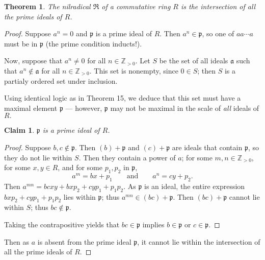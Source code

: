 \documentclass[11pt]{article}
\newtheorem{theorem}{Theorem}
\newtheorem{claim}{Claim}
\begin{document}
\begin{adjustwidth}{0.5cm}{}
	\begin{theorem}
		The nilradical $\mathfrak{R}$ of a commutative ring $R$ is the intersection of all the prime ideals of $R$.
	\end{theorem}
	\begin{proof}
		Suppose $a^{n} = 0$ and $\mathfrak{p}$ is a prime ideal of $R$. Then $a^{n} \in \mathfrak{p}$, so one of $aa \cdots a$ must be in $\mathfrak{p}$ (the prime condition inducts!).

		Now, suppose that $a^{n} \ne 0$ for all $n \in \mathbb{Z}_{> 0}$. Let $S$ be the set of all ideals $\mathfrak{a}$ such that $a^{n} \notin \mathfrak{a}$ for all $n \in \mathbb{Z}_{> 0}$. This set is nonempty, since $0 \in S$; then $S$ is a partialy ordered set under inclusion. 

		Using identical logic as in Theorem 15, we deduce that this set must have a maximal element $\mathfrak{p}$ --- however, $\mathfrak{p}$ may not be maximal in the scale of \textit{all} ideals of $R.$
		\begin{adjustwidth}{0.5cm}{}
			\begin{claim}
				$\mathfrak{p}$ is a prime ideal of $R$.
			\end{claim}
			\begin{proof}\renewcommand{\qedsymbol}{}
				Suppose $b,c \notin \mathfrak{p}$. Then $(b) + \mathfrak{p}$ and $(c) + \mathfrak{p}$ are ideals that contain $\mathfrak{p}$, so they do not lie within $S$. Then they contain a power of $a$; for some $m, n \in \mathbb{Z}_{> 0}$, for some $x, y \in R$, and for some $p_{1}, p_{2}$ in $\mathfrak{p}$,
				\[
					a^{m} = bx + p_{1} \qquad \text{and} \qquad a^{n} = cy + p_{2}.
				\]
				Then $a^{mn} = bcxy + bx p_{2} + cy p_{1} + p_{1}p_{2}$. As $\mathfrak{p}$ is an ideal, the entire expression $bx p_{2} + cy p_{1} + p_{1}p_{2}$ lies within $\mathfrak{p}$; thus $a^{mn} \in (bc) + \mathfrak{p}$. Then $(bc) + \mathfrak{p}$ cannot lie within $S$; thus $bc \notin \mathfrak{p}$. 

				Taking the contrapositive yields that $bc \in \mathfrak{p}$ implies $b \in \mathfrak{p}$ or $c \in \mathfrak{p}$.
			\end{proof}
		\end{adjustwidth}
		Then as $a$ is absent from the prime ideal $\mathfrak{p}$, it cannot lie within the intersection of all the prime ideals of $R$.
	\end{proof}
\end{adjustwidth}
\end{document}
